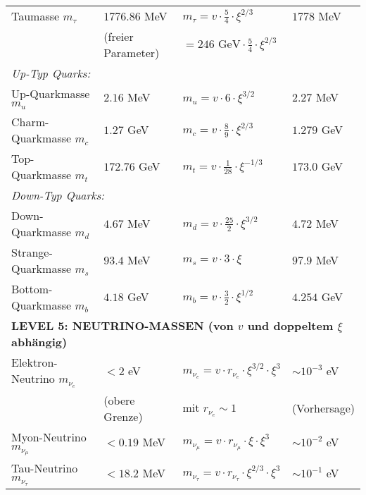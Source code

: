 \documentclass[12pt,a4paper]{article}
\begin{document}
\begin{longtable}{p{4.5cm}p{3.5cm}p{3.5cm}p{3.5cm}}
		Taumasse $m_\tau$ & $1776.86$ MeV & $m_\tau = v \cdot \frac{5}{4} \cdot \xi^{2/3}$ & $1778$ MeV \\
		& (freier Parameter) & $= 246 \text{ GeV} \cdot \frac{5}{4} \cdot \xi^{2/3}$ & \\[0.3em]
		
		\multicolumn{4}{l}{\textit{Up-Typ Quarks:}} \\
		
		Up-Quarkmasse $m_u$ & $2.16$ MeV & $m_u = v \cdot 6 \cdot \xi^{3/2}$ & $2.27$ MeV \\
		
		Charm-Quarkmasse $m_c$ & $1.27$ GeV & $m_c = v \cdot \frac{8}{9} \cdot \xi^{2/3}$ & $1.279$ GeV \\
		
		Top-Quarkmasse $m_t$ & $172.76$ GeV & $m_t = v \cdot \frac{1}{28} \cdot \xi^{-1/3}$ & $173.0$ GeV \\
		
		\multicolumn{4}{l}{\textit{Down-Typ Quarks:}} \\
		
		Down-Quarkmasse $m_d$ & $4.67$ MeV & $m_d = v \cdot \frac{25}{2} \cdot \xi^{3/2}$ & $4.72$ MeV \\
		
		Strange-Quarkmasse $m_s$ & $93.4$ MeV & $m_s = v \cdot 3 \cdot \xi$ & $97.9$ MeV \\
		
		Bottom-Quarkmasse $m_b$ & $4.18$ GeV & $m_b = v \cdot \frac{3}{2} \cdot \xi^{1/2}$ & $4.254$ GeV \\
		
		\midrule
		\multicolumn{4}{l}{\textbf{LEVEL 5: NEUTRINO-MASSEN (von $v$ und doppeltem $\xi$ abhängig)}} \\
		\midrule
		
		Elektron-Neutrino $m_{\nu_e}$ & $< 2$ eV & $m_{\nu_e} = v \cdot r_{\nu_e} \cdot \xi^{3/2} \cdot \xi^3$ & $\sim 10^{-3}$ eV \\
		& (obere Grenze) & mit $r_{\nu_e} \sim 1$ & (Vorhersage) \\[0.3em]
		
		Myon-Neutrino $m_{\nu_\mu}$ & $< 0.19$ MeV & $m_{\nu_\mu} = v \cdot r_{\nu_\mu} \cdot \xi \cdot \xi^3$ & $\sim 10^{-2}$ eV \\
		
		Tau-Neutrino $m_{\nu_\tau}$ & $< 18.2$ MeV & $m_{\nu_\tau} = v \cdot r_{\nu_\tau} \cdot \xi^{2/3} \cdot \xi^3$ & $\sim 10^{-1}$ eV \\
		

\end{longtable}
\end{document}
